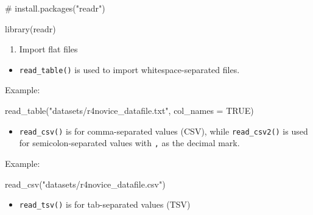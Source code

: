 \documentclass[
  letterpaper,
  DIV=11,
  numbers=noendperiod]{scrreprt}
\newenvironment{Shaded}{}{}
\newcommand{\AttributeTok}[1]{\textcolor[rgb]{0.84,0.23,0.29}{#1}}
\newcommand{\CommentTok}[1]{\textcolor[rgb]{0.42,0.45,0.49}{#1}}
\newcommand{\ConstantTok}[1]{\textcolor[rgb]{0.00,0.36,0.77}{#1}}
\newcommand{\FunctionTok}[1]{\textcolor[rgb]{0.44,0.26,0.76}{#1}}
\newcommand{\NormalTok}[1]{\textcolor[rgb]{0.14,0.16,0.18}{#1}}
\newcommand{\StringTok}[1]{\textcolor[rgb]{0.01,0.18,0.38}{#1}}
\providecommand{\tightlist}{%
  \setlength{\itemsep}{0pt}\setlength{\parskip}{0pt}}\usepackage{longtable,booktabs,array}
\begin{document}
\begin{Shaded}
\begin{Highlighting}[]
\CommentTok{\# install.packages("readr")}
\end{Highlighting}
\end{Shaded}

\begin{Shaded}
\begin{Highlighting}[]
\FunctionTok{library}\NormalTok{(readr)}
\end{Highlighting}
\end{Shaded}

\begin{enumerate}
\def\labelenumi{\alph{enumi}.}
\tightlist
\item
  Import flat files
\end{enumerate}

\begin{itemize}
\tightlist
\item
  \texttt{read\_table()} is used to import whitespace-separated files.
\end{itemize}

Example:

\begin{Shaded}
\begin{Highlighting}[]
\FunctionTok{read\_table}\NormalTok{(}\StringTok{"datasets/r4novice\_datafile.txt"}\NormalTok{, }\AttributeTok{col\_names =} \ConstantTok{TRUE}\NormalTok{)}
\end{Highlighting}
\end{Shaded}

\begin{itemize}
\tightlist
\item
  \texttt{read\_csv()} is for comma-separated values (CSV), while
  \texttt{read\_csv2()} is used for semicolon-separated values with
  \texttt{,} as the decimal mark.
\end{itemize}

Example:

\begin{Shaded}
\begin{Highlighting}[]
\FunctionTok{read\_csv}\NormalTok{(}\StringTok{"datasets/r4novice\_datafile.csv"}\NormalTok{)}
\end{Highlighting}
\end{Shaded}

\begin{itemize}
\tightlist
\item
  \texttt{read\_tsv()} is for tab-separated values (TSV)
\end{itemize}
\end{document}
